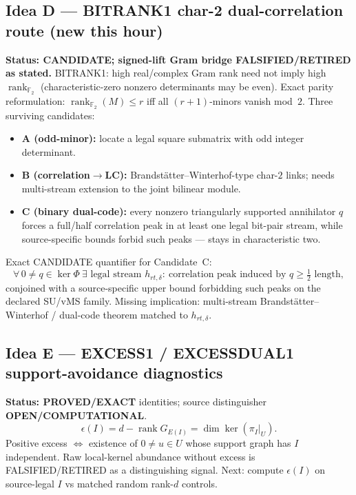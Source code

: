 \documentclass[11pt]{article}
\begin{document}
\subsection*{Idea D --- BITRANK1 char-2 dual-correlation route (new this hour)}
\textbf{Status: CANDIDATE; signed-lift Gram bridge FALSIFIED/RETIRED as stated.}
BITRANK1: high real/complex Gram rank need not imply high $\operatorname{rank}_{\mathbb F_2}$
(characteristic-zero nonzero determinants may be even). Exact parity reformulation:
$\operatorname{rank}_{\mathbb F_2}(M)\le r$ iff all $(r+1)$-minors vanish mod~$2$.
Three surviving candidates:
\begin{itemize}
\item \textbf{A (odd-minor):} locate a legal square submatrix with odd integer determinant.
\item \textbf{B (correlation$\to$LC):} Brandst\"atter--Winterhof-type char-$2$ links; needs
multi-stream extension to the joint bilinear module.
\item \textbf{C (binary dual-code):} every nonzero triangularly supported annihilator $q$
forces a full/half correlation peak in at least one legal bit-pair stream, while
source-specific bounds forbid such peaks --- stays in characteristic two.
\end{itemize}
Exact CANDIDATE quantifier for Candidate~C:
\[
\forall\,0\neq q\in\ker\Phi\ \exists\text{ legal stream }h_{rt,\delta}:\
\text{correlation peak induced by }q\ge\tfrac12\text{ length},
\]
conjoined with a source-specific upper bound forbidding such peaks on the declared
SU/vMS family. Missing implication: multi-stream Brandst\"atter--Winterhof / dual-code
theorem matched to $h_{rt,\delta}$.

\subsection*{Idea E --- EXCESS1 / EXCESSDUAL1 support-avoidance diagnostics}
\textbf{Status: PROVED/EXACT} identities; source distinguisher \textbf{OPEN/COMPUTATIONAL}.
\[
\epsilon(I)=d-\operatorname{rank}G_{E(I)}=\dim\ker(\pi_I|_U).
\]
Positive excess $\iff$ existence of $0\neq u\in U$ whose support graph has $I$ independent.
Raw local-kernel abundance without excess is FALSIFIED/RETIRED as a distinguishing signal.
Next: compute $\epsilon(I)$ on source-legal $I$ vs matched random rank-$d$ controls.
\end{document}
